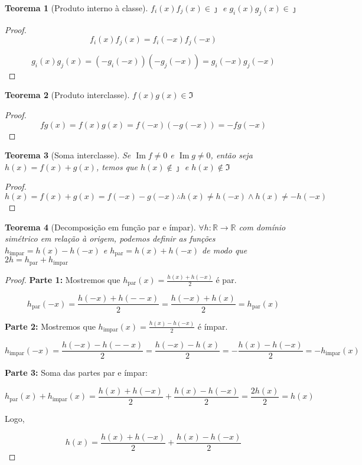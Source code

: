 \documentclass[
]{book}
\newtheorem{theorem}{Teorema}[chapter]
\theoremstyle{definition}
\theoremstyle{definition}
\theoremstyle{definition}
\theoremstyle{definition}
\theoremstyle{remark}
\begin{document}
\begin{theorem}[Produto interno à classe]
\(f_i(x)f_j(x) \in \jmath\) e \(g_i(x)g_j(x) \in \jmath\)
\end{theorem}

\begin{proof}
\[
f_i(x)f_j(x) = f_i(-x)f_j(-x)
\]

\[
g_i(x)g_j(x)=(-g_i(-x))(-g_j(-x))=g_i(-x)g_j(-x)
\]
\end{proof}

\begin{theorem}[Produto interclasse]
\(f(x)g(x) \in \Im\)
\end{theorem}

\begin{proof}
\[
fg(x) = f(x)g(x)=f(-x)(-g(-x))=-fg(-x)
\]
\end{proof}

\begin{theorem}[Soma interclasse]
Se \(\operatorname{Im} f \neq 0\) e \(\operatorname{Im} g \neq 0\), então seja \(h(x) = f(x) + g(x)\), temos que \(h(x) \notin \jmath\) e \(h(x) \notin \Im\)
\end{theorem}

\begin{proof}
\[
h(x) = f(x) + g(x) = f(-x) - g(-x) \therefore h(x) \neq h(-x) \wedge h(x) \neq -h(-x)
\]
\end{proof}

\begin{theorem}[Decomposição em função par e ímpar]
\(\forall h : \mathbb{R} \rightarrow \mathbb{R}\) com domínio simétrico em relação à origem, podemos definir as funções \(h_{\text{ímpar}} = h(x)-h(-x)\) e \(h_{\text{par}} = h(x)+h(-x)\) de modo que \(2h = h_{\text{par}} + h_{\text{ímpar}}\)
\end{theorem}

\begin{proof}
\textbf{Parte 1:} Mostremos que \(h_{\text{par}}(x) = \frac{h(x) + h(-x)}{2}\) é par.

\[
h_{\text{par}}(-x) = \frac{h(-x) + h(--x)}{2} = \frac{h(-x) + h(x)}{2} = h_{\text{par}}(x)
\]

\textbf{Parte 2:} Mostremos que \(h_{\text{impar}}(x) = \frac{h(x) - h(-x)}{2}\) é ímpar.

\[
h_{\text{impar}}(-x) = \frac{h(-x) - h(--x)}{2} = \frac{h(-x) - h(x)}{2} = -\frac{h(x) - h(-x)}{2} = -h_{\text{impar}}(x)
\]

\textbf{Parte 3:} Soma das partes par e ímpar:

\[
h_{\text{par}}(x) + h_{\text{impar}}(x) = \frac{h(x) + h(-x)}{2} + \frac{h(x) - h(-x)}{2} = \frac{2h(x)}{2} = h(x)
\]

Logo,

\[
h(x) = \frac{h(x) + h(-x)}{2} + \frac{h(x) - h(-x)}{2}
\]
\end{proof}

  
\end{document}
